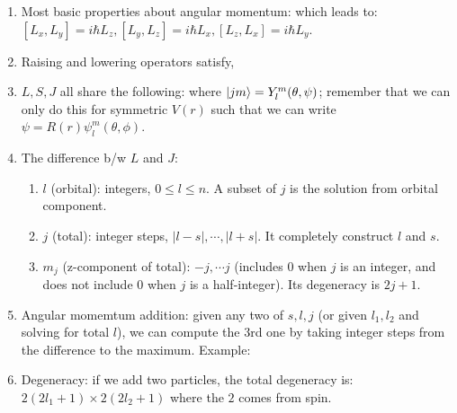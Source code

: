 \documentclass{school-22.101-notes}
\date{December 15, 2011}
\begin{document}
\maketitle

\clearpage
{} 
  \begin{enumerate}
  \item Most basic properties about angular momentum:
    which leads to: $[L_x, L_y] = i \hbar L_z, [L_y, L_z] = i \hbar L_x, [L_z, L_x] = i \hbar L_y$. 

  \item Raising and lowering operators satisfy,

  \item $L, S, J$ all share the following: where $\left| jm \right> = Y_l^m (\theta, \psi)$; remember that we can only do this for symmetric $V(r)$ such that we can write $\psi = R(r) \psi_l^m (\theta, \phi)$. 

\item The difference b/w $L$ and $J$:  
  \begin{enumerate}
  \item $l$ (orbital): integers, $0 \le l \le n$. A subset of $j$ is the solution from orbital component. 
  \item $j$ (total): integer steps, $|l-s|, \cdots, |l+s|$. It completely construct $l$ and $s$. 
  \item $m_j$ (z-component of total): $-j, \cdots j$ (includes 0 when $j$ is an integer, and does not include 0 when $j$ is a half-integer). Its degeneracy is $2j+1$. 
  \end{enumerate}



\item Angular momemtum addition: given any two of $s, l, j$ (or given $l_1, l_2$ and solving for total $l$), we can compute the 3rd one by taking integer steps from the difference to the maximum. Example: 


\item Degeneracy: if we add two particles, the total degeneracy is: $2(2l_1+1) \times 2(2l_2 +1)$ where the $2$ comes from spin. 
  \end{enumerate}
\end{document}
